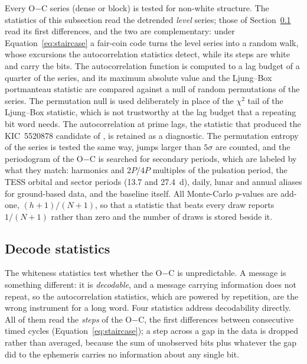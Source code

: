 \documentclass[final,5p]{elsarticle}
\newcommand{\oc}{O$-$C}
\begin{document}
Every \oc{} series (dense or block) is tested for non-white structure. The statistics of this subsection read the detrended \emph{level} series; those of Section~\ref{sec:decode} read its first differences, and the two are complementary: under Equation~\ref{eq:staircase} a fair-coin code turns the level series into a random walk, whose excursions the autocorrelation statistics detect, while its steps are white and carry the bits. The autocorrelation function is computed to a lag budget of a quarter of the series, and its maximum absolute value and the Ljung--Box portmanteau statistic \citep{Ljung1978} are compared against a null of random permutations of the series. The permutation null is used deliberately in place of the $\chi^2$ tail of the Ljung--Box statistic, which is not trustworthy at the lag budget that a repeating bit word needs. The autocorrelation at prime lags, the statistic that produced the KIC~5520878 candidate of \citet{Hippke2015}, is retained as a diagnostic. The permutation entropy \citep{Bandt2002} of the series is tested the same way, jumps larger than $5\sigma$ are counted, and the periodogram of the \oc{} is searched for secondary periods, which are labeled by what they match: harmonics and $2P$/$4P$ multiples of the pulsation period, the TESS orbital and sector periods (13.7 and 27.4~d), daily, lunar and annual aliases for ground-based data, and the baseline itself. All Monte-Carlo $p$-values are add-one, $(h+1)/(N+1)$, so that a statistic that beats every draw reports $1/(N+1)$ rather than zero and the number of draws is stored beside it.

\subsection{Decode statistics}
\label{sec:decode}

The whiteness statistics test whether the \oc{} is unpredictable. A message is something different: it is \emph{decodable}, and a message carrying information does not repeat, so the autocorrelation statistics, which are powered by repetition, are the wrong instrument for a long word. Four statistics address decodability directly. All of them read the \emph{steps} of the \oc{}, the first differences between consecutive timed cycles (Equation~\ref{eq:staircase}); a step across a gap in the data is dropped rather than averaged, because the sum of unobserved bits plus whatever the gap did to the ephemeris carries no information about any single bit.
\end{document}
